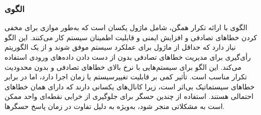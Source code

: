 \subsubsection{الگوی }
\label{ArmoushHWMOutNSec}
\begin{RTL}
الگوی  \cite{ref5}
با ارائه تکرار همگن، شامل  ماژول یکسان است
که به‌طور موازی برای مخفی کردن خطاهای تصادفی و افزایش ایمنی
و قابلیت اطمینان سیستم کار می‌کنند. این الگو نیاز دارد که
حداقل  از  ماژول برای عملکرد سیستم موفق شوند و
از یک الگوریتم رأی‌گیری برای مدیریت خطاهای تصادفی بدون از دست دادن
داده‌های ورودی استفاده می‌کند. این الگو برای سیستم‌هایی با نرخ بالای خطاهای
تصادفی و بدون محدودیت تکرار مناسب است. تأثیر کمی بر قابلیت تغییرسیستم
یا زمان اجرا دارد، اما در برابر خطاهای سیستماتیک بی‌اثر است،
زیرا کانال‌های یکسانی دارند که دارای همان خطاهای
احتمالی هستند. استفاده از چندین حسگر برای جلوگیری از
خرابی نقطه‌ای واحد ممکن است به مشکلاتی منجر شود،
به‌ویژه به دلیل تفاوت در زمان پاسخ حسگرها.
\end{RTL}